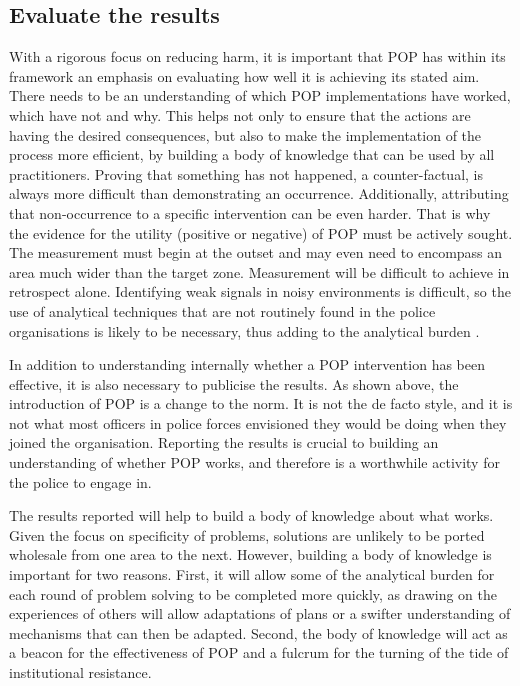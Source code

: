  
 
\subsection{Evaluate the results}

With a rigorous focus on reducing harm, it is important that POP has within its framework an emphasis on evaluating how well it is achieving its stated aim. There needs to be an understanding of which POP implementations have worked, which have not and why. This helps not only to ensure that the actions are having the desired consequences, but also to make the implementation of the process more efficient, by building a body of knowledge that can be used by all practitioners.
Proving that something has not happened, a counter-factual, is always more difficult than demonstrating an occurrence. Additionally, attributing that non-occurrence to a specific intervention can be even harder. That is why the evidence for the utility (positive or negative) of POP must be actively sought. The measurement must begin at the outset and may even need to encompass an area much wider than the target zone. Measurement will be difficult to achieve in retrospect alone. Identifying weak signals in noisy environments is difficult, so the use of analytical techniques that are not routinely found in the police organisations is likely to be necessary, thus adding to the analytical burden \parencite{popchap11}.  

In addition to understanding internally whether a POP intervention has been effective, it is also necessary to publicise the results. As shown above, the introduction of POP is a change to the norm. It is not the de facto style, and it is not what most officers in police forces envisioned they would be doing when they joined the organisation. Reporting the results is crucial to building an understanding of whether POP works, and therefore is a worthwhile activity for the police to engage in.

The results reported will help to build a body of knowledge about what works. Given the focus on specificity of problems, solutions are unlikely to be ported wholesale from one area to the next. However, building a body of knowledge is important for two reasons. First, it will allow some of the analytical burden for each round of problem solving to be completed more quickly, as drawing on the experiences of others will allow adaptations of plans or a swifter understanding of mechanisms that can then be adapted. Second, the body of knowledge will act as a beacon for the effectiveness of POP and a fulcrum for the turning of the tide of institutional resistance.
 
